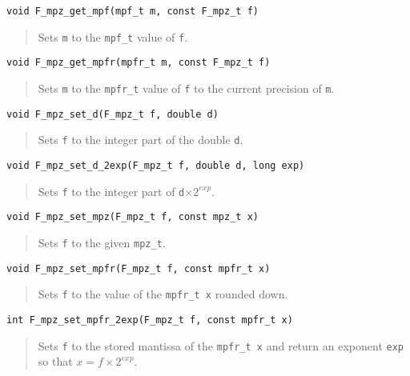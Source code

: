 \documentclass[a4paper,10pt]{article}
\newcommand{\code}{\lstinline}
\begin{document}
\begin{lstlisting}
void F_mpz_get_mpf(mpf_t m, const F_mpz_t f)
\end{lstlisting}
\begin{quote}
Sets \code{m} to the \code{mpf_t} value of \code{f}.
\end{quote}

\begin{lstlisting}
void F_mpz_get_mpfr(mpfr_t m, const F_mpz_t f)
\end{lstlisting}
\begin{quote}
Sets \code{m} to the \code{mpfr_t} value of \code{f} to the current precision of \code{m}.
\end{quote}

\begin{lstlisting}
void F_mpz_set_d(F_mpz_t f, double d)
\end{lstlisting}
\begin{quote}
Sets \code{f} to the integer part of the double \code{d}.
\end{quote}

\begin{lstlisting}
void F_mpz_set_d_2exp(F_mpz_t f, double d, long exp)
\end{lstlisting}
\begin{quote}
Sets \code{f} to the integer part of \code{d}$\times 2^{exp}$.
\end{quote}

\begin{lstlisting}
void F_mpz_set_mpz(F_mpz_t f, const mpz_t x)
\end{lstlisting}
\begin{quote}
Sets \code{f} to the given \code{mpz_t}.
\end{quote}

\begin{lstlisting}
void F_mpz_set_mpfr(F_mpz_t f, const mpfr_t x)
\end{lstlisting}
\begin{quote}
Sets \code{f} to the value of the \code{mpfr_t x} rounded down.
\end{quote}

\begin{lstlisting}
int F_mpz_set_mpfr_2exp(F_mpz_t f, const mpfr_t x)
\end{lstlisting}
\begin{quote}
Sets \code{f} to the stored mantissa of the \code{mpfr_t x} and return an exponent \code{exp} so that $x = f\times 2^{exp}$.
\end{quote}
\end{document}
